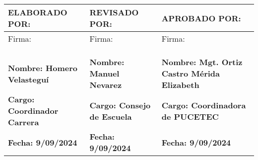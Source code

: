 \begin{tabularx}{\textwidth}{|X|X|X|}
    \hline
    \textbf{ELABORADO POR:} & \textbf{REVISADO POR:} & \textbf{APROBADO POR:} \\ \hline
    Firma: & Firma: & Firma:\\
    &&\\
    &&\\
    &&\\ \hline
    \textbf{Nombre: Homero Velasteguí} & \textbf{Nombre: Manuel Nevarez} & \textbf{Nombre: Mgt. Ortiz Castro Mérida Elizabeth} \\ \hline
    \textbf{Cargo: Coordinador Carrera} & \textbf{Cargo: Consejo de Escuela} & \textbf{Cargo: Coordinadora de PUCETEC} \\ \hline
    \textbf{Fecha: 9/09/2024} & \textbf{Fecha: 9/09/2024} & \textbf{Fecha: 9/09/2024} \\ \hline
    \end{tabularx}
